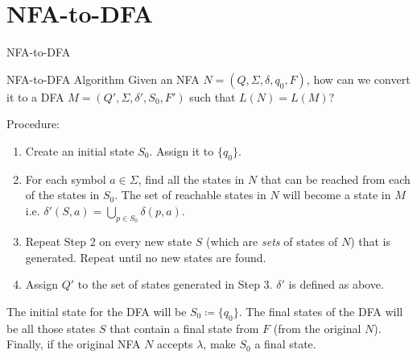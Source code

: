 \documentclass[10pt]{beamer}
\begin{document}
\section{NFA-to-DFA}

\begin{frame}{NFA-to-DFA}

\end{frame}

\begin{frame}{NFA-to-DFA Algorithm}
    Given an NFA $N = (Q, \Sigma, \delta, q_0, F)$, how can we convert it to a DFA $M = (Q', \Sigma, \delta', S_0, F')$ such that $L(N) = L(M)$?

    Procedure:
    \begin{enumerate}[Step 1: ]
        \item Create an initial state $S_0$. Assign it to $\{q_0\}$.
        \item For each symbol $a \in \Sigma$, find all the states in $N$ that can be reached from each of the states in $S_0$. The set of reachable states in $N$ will become a state in $M$ i.e. $\delta'(S, a) = \underset{p \in S_0}\bigcup\delta(p,a)$.
        \item Repeat Step 2 on every new state $S$ (which are \textit{sets} of states of $N$) that is generated. Repeat until no new states are found.
        \item Assign $Q'$ to the set of states generated in Step 3. $\delta'$ is defined as above.
    \end{enumerate}
    The initial state for the DFA will be $S_0 \coloneqq \{q_0\}$. The final states of the DFA will be all those states $S$ that contain a final state from $F$ (from the original $N$). Finally, if the original NFA $N$ accepts $\lambda$, make $S_0$ a final state.
\end{frame}
\end{document}
